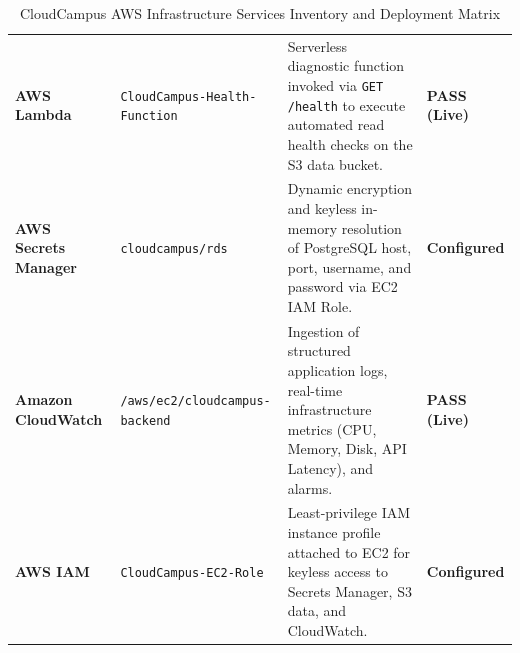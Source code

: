 \begin{table}[H]
\begin{tabularx}{\textwidth}{l p{3.2cm} X l}
\addlinespace
\textbf{AWS Lambda} & \texttt{CloudCampus-Health-Function} & Serverless diagnostic function invoked via \texttt{GET /health} to execute automated read health checks on the S3 data bucket. & \textbf{PASS (Live)} \\
\addlinespace
\textbf{AWS Secrets Manager} & \texttt{cloudcampus/rds} & Dynamic encryption and keyless in-memory resolution of PostgreSQL host, port, username, and password via EC2 IAM Role. & \textbf{Configured} \\
\addlinespace
\textbf{Amazon CloudWatch} & \texttt{/aws/ec2/cloudcampus-backend} & Ingestion of structured application logs, real-time infrastructure metrics (CPU, Memory, Disk, API Latency), and alarms. & \textbf{PASS (Live)} \\
\addlinespace
\textbf{AWS IAM} & \texttt{CloudCampus-EC2-Role} & Least-privilege IAM instance profile attached to EC2 for keyless access to Secrets Manager, S3 data, and CloudWatch. & \textbf{Configured} \\
\bottomrule
\end{tabularx}
\caption{CloudCampus AWS Infrastructure Services Inventory and Deployment Matrix}
\label{tab:aws_services_inventory}
\end{table}
